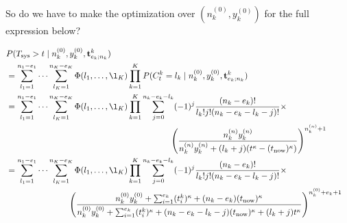 \documentclass[12pt,a4paper,fleqn]{narms}
\newcommand{\mbf}[1]{\mathbf{#1}}
\newcommand{\uz}{^{(0)}} %
\newcommand{\un}{^{(n)}} %
\def\Tsys{T_\text{sys}}
\def\ykz{y\uz_k}
\def\ykn{y\un_k}
\def\nkz{n\uz_k}
\def\nkn{n\un_k}
\def\tnow{t_\text{now}}
\begin{document}
So do we have to make the optimization over $(\nkz,\ykz)$ for the full expression below?

\begin{align}
\lefteqn{P(\Tsys > t\mid\nkz,\ykz, \mbf{t}^k_{e_k;n_k})} \\
 &= \sum_{l_1=1}^{n_1-e_1} \cdots \sum_{l_K=1}^{n_K-e_K} \Phi(l_1,\ldots,\l_K) \prod_{k=1}^K
    P(C^k_t = l_k\mid\nkz,\ykz, \mbf{t}^k_{e_k;n_k}) \\
 &= \sum_{l_1=1}^{n_1-e_1} \cdots \sum_{l_K=1}^{n_K-e_K} \Phi(l_1,\ldots,\l_K) \prod_{k=1}^K
    \sum_{j=0}^{n_k-e_k-l_k} (-1)^j \frac{(n_k - e_k)!}{l_k! j! (n_k - e_k - l_k - j)!} \times \\ & \hspace*{45ex}
    \left(\frac{\nkn\ykn}{\nkn\ykn + (l_k + j) (t^\kappa - (\tnow)^\kappa)}\right)^{\nkn + 1} \\
 &= \sum_{l_1=1}^{n_1-e_1} \cdots \sum_{l_K=1}^{n_K-e_K} \Phi(l_1,\ldots,\l_K) \prod_{k=1}^K
    \sum_{j=0}^{n_k-e_k-l_k} (-1)^j \frac{(n_k - e_k)!}{l_k! j! (n_k - e_k - l_k - j)!} \times \\ & \hspace*{17ex}
    \left(\frac{\nkz\ykz + \sum_{i=1}^{e_k} (t_i^k)^\kappa + (n_k-e_k) (\tnow)^\kappa }%
               {\nkz\ykz + \sum_{i=1}^{e_k} (t_i^k)^\kappa + (n_k-e_k-l_k-j) (\tnow)^\kappa + (l_k + j) t^\kappa }\right)^{%
    \nkz + e_k + 1} 
\end{align}
\end{document}
